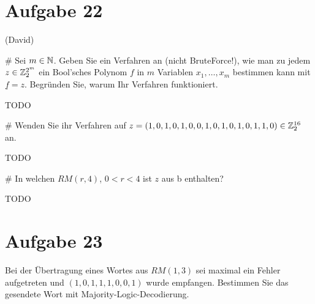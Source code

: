 
\setcounter{MaxMatrixCols}{20}

\section*{Aufgabe 22}
(David)
\begin{myList}
#
Sei $m \in \mathbb{N}$. Geben Sie ein Verfahren an (nicht BruteForce!), wie man zu jedem $z \in \mathbb{Z}^{2^m}_2$ ein Bool'sches Polynom $f$ in $m$ Variablen $x_1,\ldots,x_m$ bestimmen kann mit $\underline{f} = z$. Begründen Sie, warum Ihr Verfahren funktioniert.\medskip

TODO

#
Wenden Sie ihr Verfahren auf $z = (1,0,1,0,1,0,0,1,0,1,0,1,0,1,1,0) \in \mathbb{Z}^{16}_{2}$ an.\medskip

TODO

#
In welchen $RM(r,4)$, $0 < r < 4$ ist $z$ aus b enthalten?\medskip

TODO
\end{myList}

\section*{Aufgabe 23}
Bei der Übertragung eines Wortes aus $RM(1,3)$ sei maximal ein Fehler aufgetreten und $(1,0,1,1,1,0,0,1)$ wurde empfangen. Bestimmen Sie das gesendete Wort mit Majority-Logic-Decodierung.\medskip

